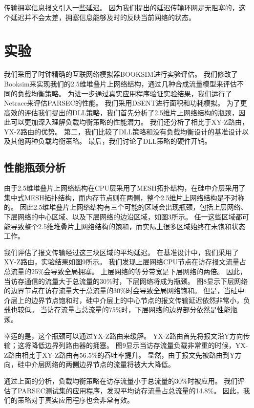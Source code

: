 传输拥塞信息报文引入一些延迟。
因为我们提出的延迟传输环网是无阻塞的，这个延迟并不会太差，拥塞信息能够及时的反映当前网络的状态。



\section{实验}

我们采用了时钟精确的互联网络模拟器BOOKSIM进行实验评估。
我们修改了Booksim来实现我们的2.5维堆叠片上网络结构，通过几种合成流量模型来评估不同的负载均衡策略。
为进一步通过真实应用程序验证实验结果，我们运行了Netrace来评估PARSEC的性能。
我们采用DSENT进行面积和功耗模拟。
为了更高效的评估我们提出的DLL策略，我们首先分析了2.5维片上网络结构的瓶颈，因此可以更加深入理解负载均衡策略的性能潜力。
我们还分析了相比于XY-Z路由，YX-Z路由的优势。
第二，我们比较了DLL策略和没有负载均衡设计的基准设计以及其他两种负载均衡策略。
最后，我们讨论了DLL策略的硬件开销。

\subsection{性能瓶颈分析}

由于2.5维堆叠片上网络结构在CPU层采用了MESH拓扑结构，在硅中介层采用了集中式MESH拓扑结构，而内存节点则在两侧，整个2.5维片上网络结构是不对称的。
因此2.5维堆叠片上网络结构有三个可能的区域会出现瓶颈，包括上层网络、下层网络的中心区域、以及下层网络的边沿区域，如图3所示。
任一这些区域都可能导致整个2.5维堆叠片上网络结构的饱和，而实际上很多区域始终在未饱和状态工作。

我们评估了报文传输经过这三块区域的平均延迟。
在基准设计中，我们采用了XY-Z路由，实验结果如图9所示。
我们发现上层网络CPU节点在访存报文流量占总流量的25\%会导致全局拥塞。
上层网络的等分带宽是下层网络的两倍。
因此，当访存通信的流量大于总流量的30\%时，下层网络将成为瓶颈。
图8显示下层网络的边界节点在访存流量大于总流量的30\%时会导致全局网络饱和。
但是，当硅中介层上的边界节点饱和时，硅中介层上的中心节点的报文传输延迟依然非常小，负载也较低。
当访存流量占总流量的75\%时，下层网络的边界部分依然是性能瓶颈。

幸运的是，这个瓶颈可以通过YX-Z路由来缓解。
YX-Z路由首先将报文沿Y方向传输；这将降低边界列路由器的拥塞。
图9显示当访存流量负载非常重的时候，YX-Z路由相比于XY-Z路由有56.5\%的吞吐率提升。
显然，由于报文先被路由到Y方向，硅中介层网络的两侧边界节点的流量将被大大降低。

通过上面的分析，负载均衡策略在访存流量小于总流量的30\%时被应用。
我们评估了PARSEC测试集的应用程序，发现平均访存流量占总流量的14.8\%。
因此，我们的策略对于真实应用程序也会非常有效。

